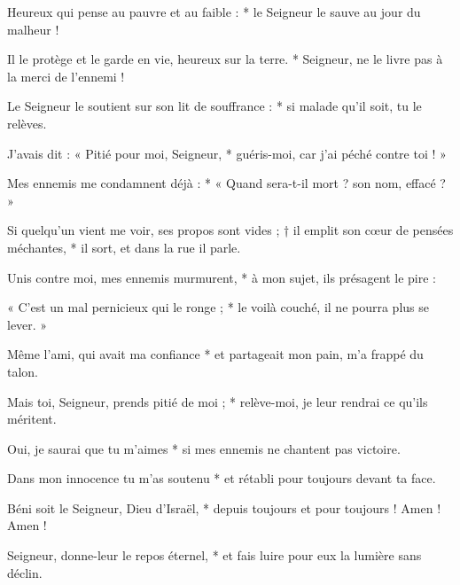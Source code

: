 \item Heureux qui pense au pauvre et au faible : * le Seigneur le sauve au jour du malheur !

\item Il le protège et le garde en vie, heureux sur la terre. * Seigneur, ne le livre pas à la merci de l'ennemi !

\item Le Seigneur le soutient sur son lit de souffrance : * si malade qu'il soit, tu le relèves.

\item J'avais dit : « Pitié pour moi, Seigneur, * guéris-moi, car j'ai péché contre toi ! »

\item Mes ennemis me condamnent déjà : * « Quand sera-t-il mort ? son nom, effacé ? »

\item Si quelqu'un vient me voir, ses propos sont vides ; † il emplit son cœur de pensées méchantes, * il sort, et dans la rue il parle.

\item Unis contre moi, mes ennemis murmurent, * à mon sujet, ils présagent le pire :

\item « C'est un mal pernicieux qui le ronge ; * le voilà couché, il ne pourra plus se lever. »

\item Même l'ami, qui avait ma confiance * et partageait mon pain, m'a frappé du talon.

\item Mais toi, Seigneur, prends pitié de moi ; * relève-moi, je leur rendrai ce qu'ils méritent.

\item Oui, je saurai que tu m'aimes * si mes ennemis ne chantent pas victoire.

\item Dans mon innocence tu m'as soutenu * et rétabli pour toujours devant ta face.

\item Béni soit le Seigneur, Dieu d'Israël, * depuis toujours et pour toujours ! Amen ! Amen !

\item Seigneur, donne-leur le repos éternel, * et fais luire pour eux la lumière sans déclin.